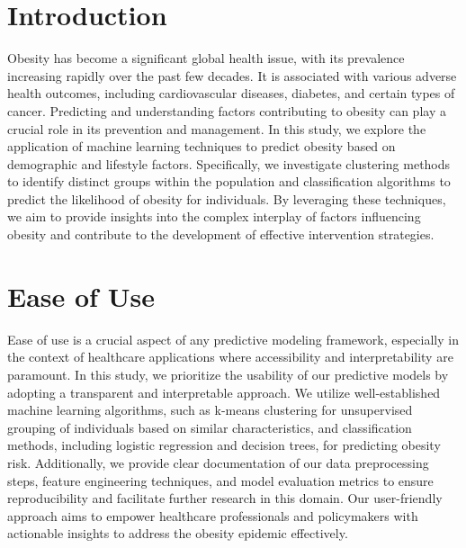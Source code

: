 \documentclass[conference]{IEEEtran}
\begin{document}
\section{Introduction}
Obesity has become a significant global health issue, with its prevalence increasing rapidly over the past few decades. It is associated with various adverse health outcomes, including cardiovascular diseases, diabetes, and certain types of cancer. Predicting and understanding factors contributing to obesity can play a crucial role in its prevention and management. In this study, we explore the application of machine learning techniques to predict obesity based on demographic and lifestyle factors. Specifically, we investigate clustering methods to identify distinct groups within the population and classification algorithms to predict the likelihood of obesity for individuals. By leveraging these techniques, we aim to provide insights into the complex interplay of factors influencing obesity and contribute to the development of effective intervention strategies.
\section{Ease of Use}
Ease of use is a crucial aspect of any predictive modeling framework, especially in the context of healthcare applications where accessibility and interpretability are paramount. In this study, we prioritize the usability of our predictive models by adopting a transparent and interpretable approach. We utilize well-established machine learning algorithms, such as k-means clustering for unsupervised grouping of individuals based on similar characteristics, and classification methods, including logistic regression and decision trees, for predicting obesity risk. Additionally, we provide clear documentation of our data preprocessing steps, feature engineering techniques, and model evaluation metrics to ensure reproducibility and facilitate further research in this domain. Our user-friendly approach aims to empower healthcare professionals and policymakers with actionable insights to address the obesity epidemic effectively.
\end{document}
